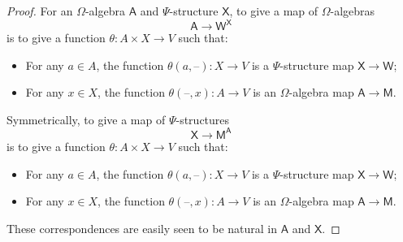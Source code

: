 \documentclass[11pt, a4paper, twoside,leqno]{amsart}
\newcommand{\thg}{{\mathord{\text{--}}}}
\numberwithin{equation}{section}
\theoremstyle{plain}
\theoremstyle{definition}
\begin{document}
\begin{proof}
  For an \(\Omega\)-algebra $\mathsf A$ and \(\Psi\)-structure $\mathsf X$, to give a map of \(\Omega\)-algebras
  \begin{equation*}
    \mathsf{A} \rightarrow \mathsf W^{\mathsf{X}}
  \end{equation*}
  is to give a function \(\theta \colon A \times X \rightarrow V\) such
  that:
  \begin{itemize}
  \item For any \(a\in A\), the function $\theta(a, \thg) \colon X
    \rightarrow V$ is a \(\Psi\)-structure map $\mathsf{X} \rightarrow \mathsf{W}$;
  \item For any \(x\in X\), the function $\theta(\thg, x) \colon A
    \rightarrow V$ is an \(\Omega\)-algebra map $\mathsf{A} \rightarrow \mathsf{M}$.
  \end{itemize}
  Symmetrically, to give a map of \(\Psi\)-structures
  \begin{equation*}
    \mathsf{X} \rightarrow \mathsf{M}^\mathsf{A}
  \end{equation*}
  is to give a function \(\theta \colon A \times X \rightarrow V\) such
  that:
  \begin{itemize}
  \item For any \(a\in A\), the function $\theta(a, \thg) \colon X
    \rightarrow V$ is a \(\Psi\)-structure map $\mathsf{X} \rightarrow \mathsf{W}$;
  \item For any \(x\in X\), the function $\theta(\thg, x) \colon A
    \rightarrow V$ is an \(\Omega\)-algebra map $\mathsf{A} \rightarrow \mathsf{M}$.
  \end{itemize}
  These correspondences are easily seen to be natural in $\mathsf{A}$ and $\mathsf{X}$.
\end{proof}
\end{document}
